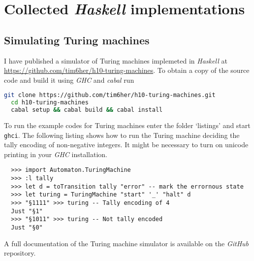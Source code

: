 % 

\section{Collected \emph{Haskell} implementations}

\subsection{Simulating Turing machines}%
\label{app:turing}%

I have published a simulator of Turing machines implemeted in \emph{Haskell}
at \url{https://github.com/tim6her/h10-turing-machines}. To obtain a copy of
the source code and build it using \emph{GHC} and \emph{cabal} run

\begin{lstlisting}[language=bash]
  git clone https://github.com/tim6her/h10-turing-machines.git
  cd h10-turing-machines
  cabal setup && cabal build && cabal install
\end{lstlisting}

To run the example codes for Turing machines enter the folder ‘listings’ and
start \verb+ghci+. The following listing shows how to run the Turing machine
deciding the tally encoding of non-negative integers. It might be necessary to
turn on unicode printing in your \emph{GHC} installation.

\begin{lstlisting}
  >>> import Automaton.TuringMachine
  >>> :l tally
  >>> let d = toTransition tally "error" -- mark the errornous state
  >>> let turing = TuringMachine "start" '_' "halt" d
  >>> "§1111" >>> turing -- Tally encoding of 4
  Just "§1"
  >>> "§1011" >>> turing -- Not tally encoded
  Just "§0"
\end{lstlisting}

A full documentation of the Turing machine simulator is available on the
\emph{GitHub} repository.

